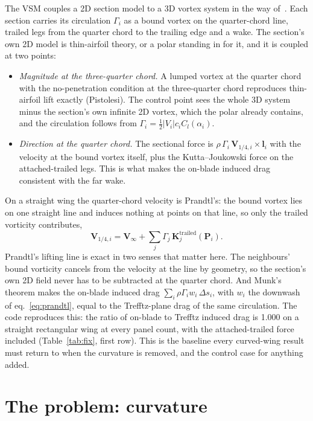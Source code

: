\documentclass[11pt,a4paper]{article}
\begin{document}
The VSM couples a 2D section model to a 3D vortex system in the way of~\cite{gaunaa2026}. Each section carries its circulation $\Gamma_i$ as a bound vortex on the quarter-chord line, trailed legs from the quarter chord to the trailing edge and a wake. The section's own 2D model is thin-airfoil theory, or a polar standing in for it, and it is coupled at two points:
\begin{itemize}[nosep]
  \item \emph{Magnitude at the three-quarter chord.} A lumped vortex at the quarter chord with the no-penetration condition at the three-quarter chord reproduces thin-airfoil lift exactly (Pistolesi). The control point sees the whole 3D system minus the section's own infinite 2D vortex, which the polar already contains, and the circulation follows from $\Gamma_i=\tfrac12|V_i|c_iC_l(\alpha_i)$.
  \item \emph{Direction at the quarter chord.} The sectional force is $\rho\,\Gamma_i\,\mathbf V_{1/4,i}\times\mathbf l_i$ with the velocity at the bound vortex itself, plus the Kutta--Joukowski force on the attached-trailed legs. This is what makes the on-blade induced drag consistent with the far wake.
\end{itemize}

On a straight wing the quarter-chord velocity is Prandtl's: the bound vortex lies on one straight line and induces nothing at points on that line, so only the trailed vorticity contributes,
\begin{equation}
\mathbf V_{1/4,i}=\mathbf V_\infty+\sum_j\Gamma_j\,\mathbf K^{\mathrm{trailed}}_j(\mathbf P_i).
\label{eq:prandtl}
\end{equation}
Prandtl's lifting line is exact in two senses that matter here. The neighbours' bound vorticity cancels from the velocity at the line by geometry, so the section's own 2D field never has to be subtracted at the quarter chord. And Munk's theorem makes the on-blade induced drag $\sum_i\rho\Gamma_i w_i\,\Delta s_i$, with $w_i$ the downwash of eq.~\eqref{eq:prandtl}, equal to the Trefftz-plane drag of the same circulation. The code reproduces this: the ratio of on-blade to Trefftz induced drag is 1.000 on a straight rectangular wing at every panel count, with the attached-trailed force included (Table~\ref{tab:fix}, first row). This is the baseline every curved-wing result must return to when the curvature is removed, and the control case for anything added.

\section{The problem: curvature}
\label{sec:problem}
\end{document}
